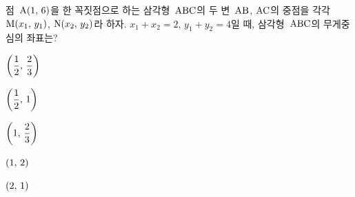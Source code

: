 점~$\mathrm{A}(1,\mkern3mu 6)$을 한 꼭짓점으로 하는 삼각형~$\mathrm{ABC}$의 두 변~$\mathrm{AB}$, $\mathrm{AC}$의 중점을 각각 $\mathrm{M}(x_1,\mkern3mu y_1)$, $\mathrm{N}(x_2,\mkern3mu y_2)$라 하자. $x_1+x_2=2$, $y_1+y_2=4$일 때, 삼각형~$\mathrm{ABC}$의 무게중심의 좌표는?
\begin{choices32}{\rule[-3ex]{0pt}{8ex}$\left(\dfrac{1}{2},\mkern3mu \dfrac{2}{3}\right)$}{\rule[-3ex]{0pt}{8ex}$\left(\dfrac{1}{2},\mkern3mu 1\right)$}{\rule[-3ex]{0pt}{8ex}$\left(1,\mkern3mu \dfrac{2}{3}\right)$}{\rule[-3ex]{0pt}{8ex}$(1,\mkern3mu 2)$}{\rule[-3ex]{0pt}{8ex}$(2,\mkern3mu 1)$}\end{choices32}
